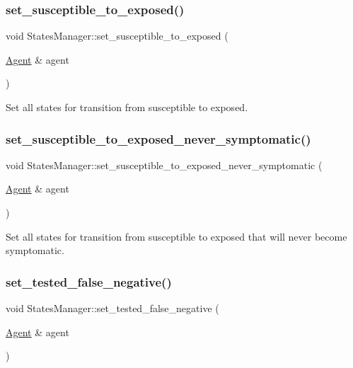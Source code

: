 \subsubsection{\texorpdfstring{set\+\_\+susceptible\+\_\+to\+\_\+exposed()}{set\_susceptible\_to\_exposed()}}
{\footnotesize\ttfamily void States\+Manager\+::set\+\_\+susceptible\+\_\+to\+\_\+exposed (\begin{DoxyParamCaption}\item[{\hyperlink{classAgent}{Agent} \&}]{agent }\end{DoxyParamCaption})}



Set all states for transition from susceptible to exposed. 

\mbox{\label{classStatesManager_a1d6cbcb237b03565c83f4f618da08cbe}} 
\subsubsection{\texorpdfstring{set\+\_\+susceptible\+\_\+to\+\_\+exposed\+\_\+never\+\_\+symptomatic()}{set\_susceptible\_to\_exposed\_never\_symptomatic()}}
{\footnotesize\ttfamily void States\+Manager\+::set\+\_\+susceptible\+\_\+to\+\_\+exposed\+\_\+never\+\_\+symptomatic (\begin{DoxyParamCaption}\item[{\hyperlink{classAgent}{Agent} \&}]{agent }\end{DoxyParamCaption})}



Set all states for transition from susceptible to exposed that will never become symptomatic. 

\mbox{\label{classStatesManager_ad6f9193dcf05f4f37e71a94d58315481}} 
\subsubsection{\texorpdfstring{set\+\_\+tested\+\_\+false\+\_\+negative()}{set\_tested\_false\_negative()}}
{\footnotesize\ttfamily void States\+Manager\+::set\+\_\+tested\+\_\+false\+\_\+negative (\begin{DoxyParamCaption}\item[{\hyperlink{classAgent}{Agent} \&}]{agent }\end{DoxyParamCaption})}



